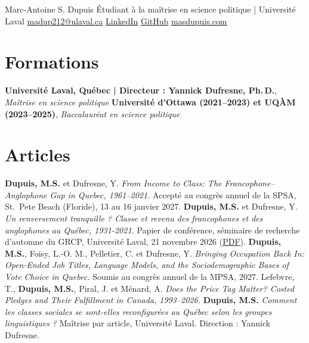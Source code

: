 \documentclass[10pt,letterpaper]{article}
\begin{document}
\cvheader
  {Marc-Antoine S. Dupuis}
  {Étudiant à la maîtrise en science politique | Université Laval}
  {\href{mailto:madup212@ulaval.ca}{madup212@ulaval.ca}\cvsep
   \href{https://www.linkedin.com/in/marc-antoine-dupuis-a6a069233/}{LinkedIn}\cvsep
   \href{https://github.com/MADUP212}{GitHub}\cvsep
   \href{https://www.masdupuis.com/fr/}{masdupuis.com}}

\section*{Formations}
  {\textbf{Université Laval, Québec | Directeur : Yannick Dufresne, Ph.\,D.}, \textit{Maîtrise en science politique}}{}
  {\textbf{Université d'Ottawa (2021--2023) et UQÀM (2023--2025)}, \textit{Baccalauréat en science politique}}{}

\section*{Articles}
  {\textbf{Dupuis, M.S.} et Dufresne, Y. \foreignlanguage{english}{\textit{From Income to Class: The Francophone--Anglophone Gap
   in Quebec, 1961--2021.}}}
  {Accepté au congrès annuel de la SPSA, St.\ Pete Beach (Floride), 13 au 16 janvier 2027.}
  {\textbf{Dupuis, M.S.} et Dufresne, Y. \textit{Un renversement tranquille ? Classe et revenu des francophones et des anglophones au Québec, 1931-2021.}}
  {Papier de conférence, séminaire de recherche d'automne du GRCP, Université Laval, 21 novembre 2026 (\href{https://www.masdupuis.com/papers/du-revenu-a-la-classe.pdf}{PDF}).}
  {\textbf{Dupuis, M.S.}, Foisy, L.-O. M., Pelletier, C. et Dufresne, Y. \foreignlanguage{english}{\textit{Bringing Occupation
   Back In: Open-Ended Job Titles, Language Models, and the Sociodemographic Bases of Vote Choice in Quebec.}}}
  {Soumis au congrès annuel de la MPSA, 2027.}
  {Lefebvre, T., \textbf{Dupuis, M.S.}, Piral, J. et Ménard, A. \foreignlanguage{english}{\textit{Does the Price Tag Matter?
   Costed Pledges and Their Fulfillment in Canada, 1993--2026.}}}{}
  {\textbf{Dupuis, M.S.} \textit{Comment les classes sociales se sont-elles reconfigurées au Québec selon
   les groupes linguistiques ?}}
  {Maîtrise par article, Université Laval. Direction : Yannick Dufresne.}
\end{document}

